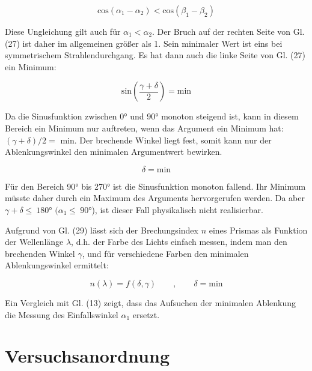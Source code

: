 \documentclass[11pt,ngerman]{scrartcl}
\begin{document}
\begin{equation}
	\textrm{cos}(\alpha_1 -\alpha_2) < \textrm{cos}(\beta_1 - \beta_2)
\end{equation}

Diese Ungleichung gilt auch für $\alpha_1 < \alpha_2$. Der Bruch auf der rechten Seite von Gl. (27) ist daher
im allgemeinen größer als 1. Sein minimaler Wert ist eins bei symmetrischem Strahlendurchgang.
Es hat dann auch die linke Seite von Gl. (27) ein Minimum:

\begin{equation}
	\textrm{sin}\left(\frac{\gamma + \delta}{2}\right) = \textrm{min}
\end{equation}

Da die Sinusfunktion zwischen 0° und 90° monoton steigend ist, kann in diesem Bereich ein
Minimum nur auftreten, wenn das Argument ein Minimum hat: $(\gamma + \delta)/2 = $ min. Der brechende
Winkel liegt fest, somit kann nur der Ablenkungswinkel den minimalen Argumentwert bewirken.

\begin{equation}
	\delta = \textrm{min}
\end{equation}

Für den Bereich 90° bis 270° ist die Sinusfunktion monoton fallend. Ihr Minimum müsste daher
durch ein Maximum des Arguments hervorgerufen werden. Da aber $\gamma + \delta \leq \  180$° $(\alpha_1 \leq \ 90$°), ist
dieser Fall physikalisch nicht realisierbar.

Aufgrund von Gl. (29) lässt sich der Brechungsindex $n$ eines Prismas als Funktion der Wellenlänge
$\lambda$, d.h. der Farbe des Lichts einfach messen, indem man den brechenden Winkel $\gamma$, und für
verschiedene Farben den minimalen Ablenkungswinkel ermittelt:

\begin{equation}
	n (\lambda) = f(\delta,\gamma) \qquad, \qquad \delta = \textrm{min}
\end{equation}

Ein Vergleich mit Gl. (13) zeigt, dass das Aufsuchen der minimalen Ablenkung die Messung des
Einfallswinkel $\alpha_1$ ersetzt.





\newpage

\section{Versuchsanordnung}\label{sec:Versuchsanordnung}
\end{document}
